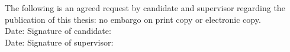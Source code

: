 \noindent
The following is an agreed request by candidate and supervisor regarding the
publication of this thesis:
no embargo on print copy or electronic copy. \\

\noindent
Date:\makebox[7em]{\dotfill}
Signature of candidate:\dotfill
\\

\noindent
Date:\makebox[7em]{\dotfill}
Signature of supervisor:\dotfill
